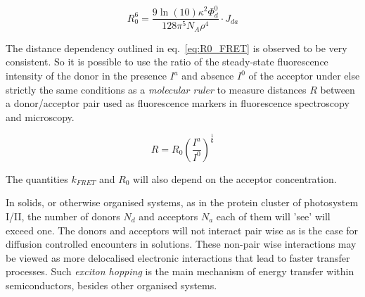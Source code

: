 			\begin{equation}
				\label{eq:R0_FRET}
				R^6_0 = \frac{9\ln(10)\kappa^2\Phi^0_d}{128\pi^5 N_A\rho^4}\cdot J_{da}
			\end{equation}

			The distance dependency outlined in eq.~\ref{eq:R0_FRET} is observed to be very consistent. So it is possible to use the ratio of the steady-state fluorescence intensity of the donor in the presence $I^a$ and absence $I^0$ of the acceptor under else strictly the same conditions as a \emph{molecular ruler} to measure distances $R$ between a donor/acceptor pair used as fluorescence markers in fluorescence spectroscopy and microscopy.

			\begin{equation}
				R = R_0 \left(\frac{I^a}{I^0}\right)^{\frac{1}{6}}
			\end{equation}

			The quantities $k_{FRET}$ and $R_0$ will also depend on the acceptor concentration.

			In solids, or otherwise organised systems, as in the protein cluster of photosystem I/II, the number of donors $N_d$ and acceptors $N_a$ each of them will 'see' will exceed one. The donors and acceptors will not interact pair wise as is the case for  diffusion controlled encounters in solutions. These non-pair wise interactions may be viewed as more delocalised electronic interactions that lead to faster transfer processes. Such \emph{exciton hopping} is the main mechanism of energy transfer within semiconductors, besides other organised systems.

